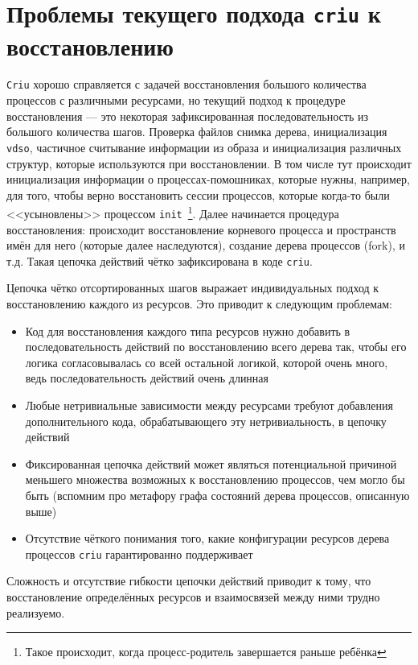 \section{Проблемы текущего подхода \texttt{criu} к восстановлению}
\label{chap1:sec:problems}

\texttt{Criu} хорошо справляется с задачей восстановления большого количества процессов с различными ресурсами, но
текущий подход к процедуре восстановления --- это некоторая зафиксированная последовательность из большого количества шагов. Проверка файлов снимка дерева, инициализация \texttt{vdso}, частичное считывание информации из образа и инициализация различных структур, которые используются при восстановлении. В том числе тут происходит инициализация информации о процессах-помошниках, которые нужны, например, для того, чтобы верно восстановить сессии процессов, которые когда-то были <<усыновлены>> процессом \texttt{init}~\footnote{Такое происходит, когда процесс-родитель завершается раньше ребёнка}. Далее начинается процедура восстановления: происходит восстановление корневого процесса и пространств имён для него (которые далее наследуются), создание дерева процессов (fork), и т.д. Такая цепочка действий чётко зафиксирована в коде \texttt{criu}.

Цепочка чётко отсортированных шагов выражает индивидуальных подход к восстановлению каждого из ресурсов. Это приводит к следующим проблемам:

\begin{itemize}
	\item Код для восстановления каждого типа ресурсов нужно добавить в последовательность действий по восстановлению всего дерева так, чтобы его логика согласовывалась со всей остальной логикой, которой очень много, ведь последовательность действий очень длинная
	\item Любые нетривиальные зависимости между ресурсами требуют добавления дополнительного кода, обрабатывающего эту нетривиальность, в цепочку действий
	\item Фиксированная цепочка действий может являться потенциальной причиной меньшего множества возможных к восстановлению процессов, чем могло бы быть (вспомним про метафору графа состояний дерева процессов, описанную выше)
	\item Отсутствие чёткого понимания того, какие конфигурации ресурсов дерева процессов \texttt{criu} гарантированно поддерживает
\end{itemize}

Сложность и отсутствие гибкости цепочки действий приводит к тому, что восстановление определённых ресурсов и взаимосвязей между ними трудно реализуемо. 

